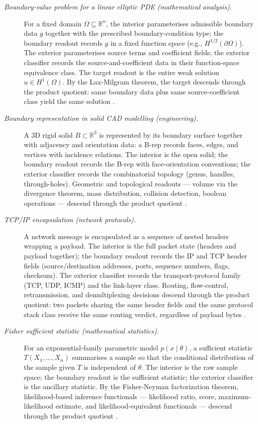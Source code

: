 \documentclass[11pt]{article}
\theoremstyle{definition}
\begin{document}
\begin{description}
\item[\emph{Boundary-value problem for a linear elliptic
{PDE} (mathematical analysis).}]
For a fixed domain \(\Omega\subseteq\mathbb R^n\), the
interior parameterises admissible boundary data
\(g\) together with the prescribed boundary-condition
type; the boundary readout records \(g\) in a fixed
function space (e.g., \(H^{1/2}(\partial\Omega)\)).
The exterior parameterises source terms and coefficient
fields; the exterior classifier records the
source-and-coefficient data in their function-space
equivalence class.  The target readout is the entire
weak solution \(u\in H^1(\Omega)\).  By the Lax-Milgram
theorem, the target descends through the product
quotient: same boundary data plus same
source-coefficient class yield the same solution
\citep{Evans2010PartialDifferential}.

\item[\emph{Boundary representation in solid {CAD}
modelling (engineering).}]
A 3D rigid solid \(B\subset\mathbb R^3\) is represented
by its boundary surface together with adjacency and
orientation data: a B-rep records faces, edges, and
vertices with incidence relations.  The interior is the
open solid; the boundary readout records the B-rep with
face-orientation conventions; the exterior classifier
records the combinatorial topology (genus, handles,
through-holes).  Geometric and topological readouts ---
volume via the divergence theorem, mass distribution,
collision detection, boolean operations --- descend
through the product quotient
\citep{Mortenson2006GeometricModeling}.

\item[\emph{{TCP/IP} encapsulation (network protocols).}]
A network message is encapsulated as a sequence of
nested headers wrapping a payload.  The interior is the
full packet state (headers and payload together); the
boundary readout records the IP and TCP header fields
(source/destination addresses, ports, sequence numbers,
flags, checksum).  The exterior classifier records the
transport-protocol family (TCP, UDP, ICMP) and the
link-layer class.  Routing, flow-control, retransmission,
and demultiplexing decisions descend through the product
quotient: two packets sharing the same header fields and
the same protocol stack class receive the same routing
verdict, regardless of payload bytes
\citep{Postel1981RFC791,Postel1981RFC793}.

\item[\emph{Fisher sufficient statistic (mathematical
statistics).}]
For an exponential-family parametric model
\(p(x\mid\theta)\), a sufficient statistic
\(T(X_1,\dots,X_n)\) summarises a sample so that the
conditional distribution of the sample given \(T\) is
independent of \(\theta\).  The interior is the raw
sample space; the boundary readout is the sufficient
statistic; the exterior classifier is the ancillary
statistic.  By the Fisher-Neyman factorization theorem,
likelihood-based inference functionals --- likelihood
ratio, score, maximum-likelihood estimate, and
likelihood-equivalent functionals --- descend through
the product quotient \citep{Fisher1922Mathematical}.


\end{description}
\end{document}
